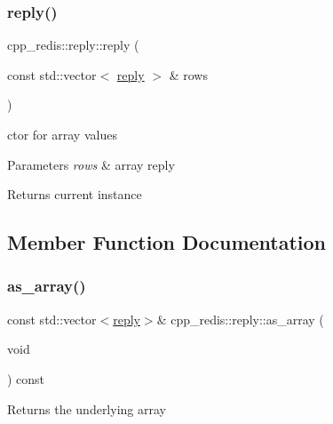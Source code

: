 \subsubsection{\texorpdfstring{reply()}{reply()}\hspace{0.1cm}{\footnotesize\ttfamily [4/4]}}
{\footnotesize\ttfamily cpp\+\_\+redis\+::reply\+::reply (\begin{DoxyParamCaption}\item[{const std\+::vector$<$ \mbox{\hyperlink{classcpp__redis_1_1reply}{reply}} $>$ \&}]{rows }\end{DoxyParamCaption})}

ctor for array values


\begin{DoxyParams}{Parameters}
{\em rows} & array reply \\
\hline
\end{DoxyParams}
\begin{DoxyReturn}{Returns}
current instance 
\end{DoxyReturn}


\subsection{Member Function Documentation}
\mbox{\label{classcpp__redis_1_1reply_af4ead6a79c9e531912c35267d5212776}} 
\subsubsection{\texorpdfstring{as\+\_\+array()}{as\_array()}}
{\footnotesize\ttfamily const std\+::vector$<$\mbox{\hyperlink{classcpp__redis_1_1reply}{reply}}$>$\& cpp\+\_\+redis\+::reply\+::as\+\_\+array (\begin{DoxyParamCaption}\item[{void}]{ }\end{DoxyParamCaption}) const}

\begin{DoxyReturn}{Returns}
the underlying array 
\end{DoxyReturn}
\mbox{\label{classcpp__redis_1_1reply_a5f54d0dada956bca564ff2d7bde866ea}} 

